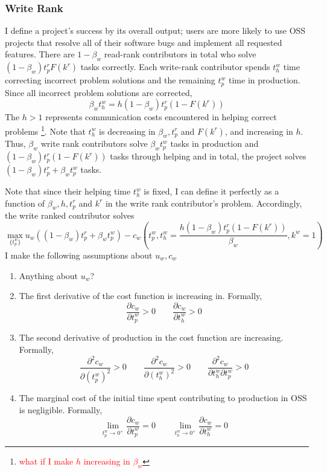 \documentclass[source/paper/main.tex]{subfiles}
\begin{document}
\subsubsection{Write Rank}
I define a project's success by its overall output; users are more likely to use OSS projects that resolve all of their software bugs and implement all requested features. There are $1-\beta_w$ read-rank contributors in total who solve $(1-\beta_w) t_p^rF(k^r)$ tasks correctly. 
Each write-rank contributor spends $t_h^w$ time correcting incorrect problem solutions and the remaining $t_p^w$ time in production. Since all incorrect problem solutions are corrected, 
$$\beta_w t_h^w = h (1-\beta_w) t_p^r(1-F(k^r))$$
The $h>1$ represents communication costs encountered in helping correct problems \footnote{ \textcolor{red}{what if I make $h$ increasing in $\beta_w$} }. Note that $t_h^w$ is decreasing in $\beta_w, t_p^r$ and $F(k^r)$, and increasing in $h$. Thus, $\beta_w$ write rank contributors solve $\beta_w t_p^w$ tasks in production and $(1-\beta_w) t_p^r(1-F(k^r))$ tasks through helping and in total, the project solves $(1-\beta_w) t_p^r + \beta_w t_p^w$ tasks.

\qquad Note that since their helping time $t_h^w$ is fixed, I can define it perfectly as a function of $\beta_w, h, t_p^r$ and $k^r$ in the write rank contributor's problem. Accordingly, the write ranked contributor solves
$$\max_{\{t_p^w\}} u_w\left((1-\beta_w) t_p^r + \beta_w t_p^w \right) - c_w\left(t_p^w, t_h^w = \frac{ h (1-\beta_w) t_p^r(1-F(k^r))}{\beta_w}, k^w = 1\right)$$
I make the following assumptions about $u_w, c_w$
\begin{enumerate}
    \item Anything about $u_w$?    
    \item The first derivative of the cost function is increasing in. Formally, 
    $$\frac{\partial c_w}{\partial t_p^w}>0 \qquad \frac{\partial c_w}{\partial t_h^w}>0 $$   
    \item  The second derivative of production in the cost function are increasing. Formally, $$ \frac{\partial^2 c_w}{\partial (t_p^w)^2}>0 \qquad  \frac{\partial^2 c_w}{\partial (t_h^w)^2}>0 \qquad  \frac{\partial^2 c_w}{\partial t_h^w \partial t_p^w}>0$$
    \item The marginal cost of the initial time spent contributing to production in OSS is negligible. Formally,
    $$\lim_{t_p^w \to 0^+} \frac{\partial c_w}{\partial t_p^w} = 0 \qquad \lim_{t_h^w \to 0^+} \frac{\partial c_w}{\partial t_h^w} = 0$$
\end{enumerate}
\end{document}
